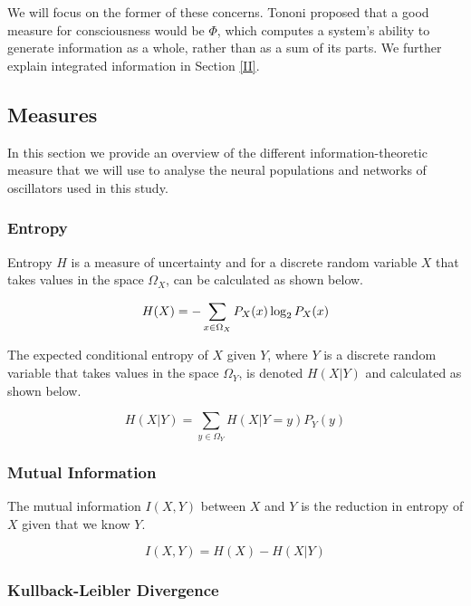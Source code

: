 \documentclass[a4paper,11pt]{article}
\begin{document}
We will focus on the former of these concerns. Tononi proposed that a good measure for consciousness would be $\Phi$, which computes a system's ability to generate information as a whole, rather than as a sum of its parts. We further explain integrated information in Section \ref{II}.

\subsection{Measures}
\label{Measures}
In this section we provide an overview of the different information-theoretic measure that we will use to analyse the neural populations and networks of oscillators used in this study.

\subsubsection{Entropy}

Entropy $H$ is a measure of uncertainty and for a discrete random variable $X$ that takes values in the space $\Omega_X$, can be calculated as shown below.

\begin{equation} \label{eq:entropy}
H(X) = - \sum_{x \in \Omega_X}P_X(x) \log_2 P_X(x)\\[2.5mm]
\end{equation}

The expected conditional entropy of $X$ given $Y$, where $Y$ is a discrete random variable that takes values in the space $\Omega_Y$, is denoted $H(X|Y)$ and calculated as shown below.

\begin{equation} \label{eq:cond-entropy}
H(X|Y) = \sum_{y \in \Omega_Y}H(X|Y=y)P_Y(y)
\end{equation}

\subsubsection{Mutual Information}

The mutual information $I(X,Y)$ between $X$ and $Y$ is the reduction in entropy of $X$ given that we know $Y$.

\begin{equation} \label{eq:mi}
I(X,Y) = H(X) - H(X|Y)
\end{equation}

\subsubsection{Kullback-Leibler Divergence}
\end{document}
